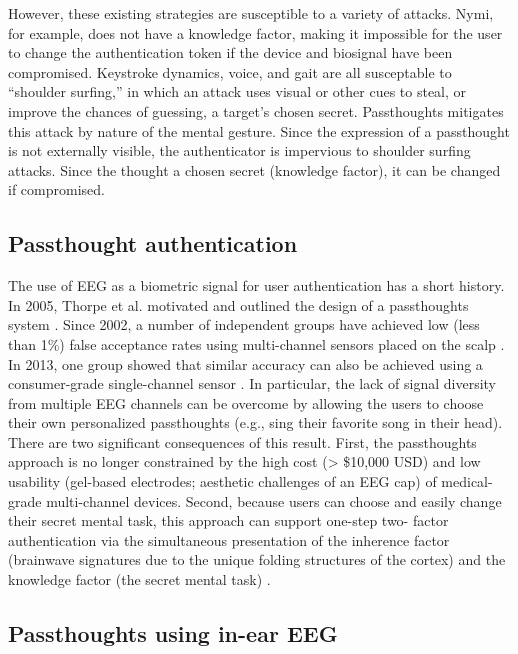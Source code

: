 \documentclass[sigconf]{acmart}
\begin{document}
However, these existing strategies are susceptible to a variety of attacks.
Nymi, for example, does not have a knowledge factor, making it impossible for
the user to change the authentication token if the device and biosignal have
been compromised. Keystroke dynamics, voice, and gait are all susceptable to
``shoulder surfing,'' in which an attack uses visual or other cues to steal, or
improve the chances of guessing, a target's chosen secret. Passthoughts
mitigates this attack by nature of the mental gesture. Since the expression of a
passthought is not externally visible, the authenticator is impervious to
shoulder surfing attacks. Since the thought a chosen secret (knowledge factor),
it can be changed if compromised.

\subsection{Passthought authentication}
\label{sec:orgc42e0c7}

The use of EEG as a biometric signal for user authentication has a short history.
In 2005, Thorpe et al. motivated and outlined the design of a passthoughts system \cite{Thorpe2005}. Since 2002, a number of independent groups have achieved low (less than 1\%) false acceptance rates using multi-channel sensors placed on the scalp \cite{Poulos2002,Marcel2007a,Palaniappan2008,Ashby2011}.
In 2013, one group showed that similar accuracy can also be
achieved using a consumer-grade single-channel sensor \cite{Chuang2013b}. 
In particular, the lack of signal diversity from multiple EEG channels can be overcome by allowing
the users to choose their own personalized passthoughts (e.g., sing their favorite
song in their head). There are two significant consequences of this result. First,
the passthoughts approach is no longer constrained by the high cost (> \$10,000 USD)
and low usability (gel-based electrodes; aesthetic challenges of an EEG cap) of
medical-grade multi-channel devices. Second, because users can choose and
easily change their secret mental task, this approach can support one-step two-
factor authentication via the simultaneous presentation of the inherence factor
(brainwave signatures due to the unique folding structures of the cortex) and the
knowledge factor (the secret mental task) \cite{Chuang2014}.

\subsection{Passthoughts using in-ear EEG}
\label{sec:orgc61af97}
\end{document}

